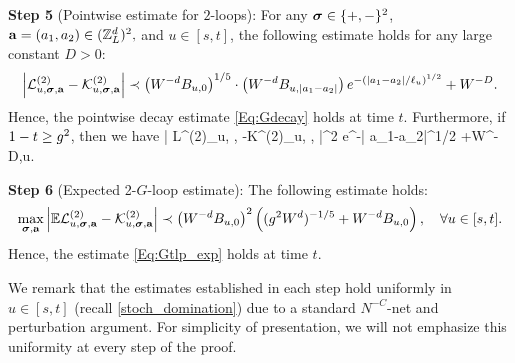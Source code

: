  \medskip
 \noindent 
\textbf{Step 5} (Pointwise estimate for $2$-loops): For any ${\boldsymbol{\sigma}}\in\{+,-\}^2$, $ {\mathbf{a}}=(a_1,a_2)\in({\mathbb Z}_L^d)^2,$ and $u\in[s,t]$, the following estimate holds for any large constant $D>0$:
 \begin{equation}\label{Eq:Gdecay_flow}
\left| {\mathcal L}^{(2)}_{u, {\boldsymbol{\sigma}}, {\mathbf{a}}}-{\mathcal K}^{(2)}_{u, {\boldsymbol{\sigma}}, {\mathbf{a}}}\right| \prec  \left({W^{-d}B_{u, 0}}\right)^{1/5}\cdot \left({W^{-d}B_{u,  |a_1-a_2| }}\right) e^{-\left({| a_1-a_2| }/{\ell_u}\right)^{1/2}} +W^{-D} . 
\end{equation}
Hence, the pointwise decay estimate \eqref{Eq:Gdecay} holds at time $t$. Furthermore, if $1-t\ge g^2$, then we have 
\be\label{Eq:Gdecay+s<g_flow}
\left| {\cal L}^{(2)}_{u, \bsig, \ba}-{\cal K}^{(2)}_{u, \bsig, \ba}\right|\prec {}^2 e^{-| a_1-a_2|^{1/2}} +W^{-D},\quad \forall u\in[s,t].
\ee

\noindent 
\textbf{Step 6} (Expected 2-$G$-loop estimate): 
The following estimate holds: 
\begin{equation}\label{Eq:Gtlp_exp_flow}
 \max_{{\boldsymbol{\sigma}}, {\mathbf{a}}}\left|\mathbb{E}{\mathcal L}^{(2)}_{u, {\boldsymbol{\sigma}}, {\mathbf{a}}}-{\mathcal K}^{(2)}_{u, {\boldsymbol{\sigma}}, {\mathbf{a}}}\right|\prec \left({W^{-d}B_{u,0}}\right)^2 \left({(g^2W^d)^{-1/5}+W^{-d}B_{u,0}}\right),\quad  
 \forall u \in [s, t] .
\end{equation}
Hence, the estimate \eqref{Eq:Gtlp_exp} holds at time $t$. 

\medskip

We remark that the estimates established in each step hold uniformly in $u\in[s,t]$ (recall \eqref{stoch_domination}) due to a standard $N^{-C}$-net and perturbation argument. For simplicity of presentation, we will not emphasize this uniformity at every step of the proof. %


